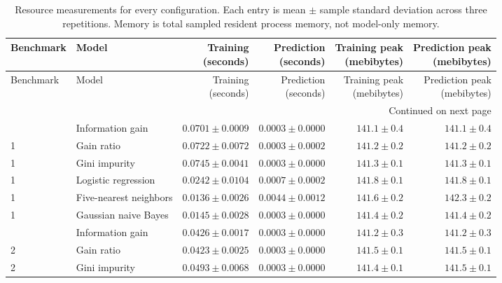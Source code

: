 \begin{longtable}{@{}l>{\raggedright\arraybackslash}p{1.05in}rrrr@{}}
\caption{Resource measurements for every configuration. Each entry is mean $\pm$ sample standard deviation across three repetitions. Memory is total sampled resident process memory, not model-only memory.}\label{tab:resources}\\
\toprule Benchmark & Model & \shortstack{Training\\(seconds)} & \shortstack{Prediction\\(seconds)} & \shortstack{Training peak\\(mebibytes)} & \shortstack{Prediction peak\\(mebibytes)} \\ \midrule
\endfirsthead
\toprule Benchmark & Model & \shortstack{Training\\(seconds)} & \shortstack{Prediction\\(seconds)} & \shortstack{Training peak\\(mebibytes)} & \shortstack{Prediction peak\\(mebibytes)} \\ \midrule
\endhead
\midrule \multicolumn{6}{r}{Continued on next page}\\ \endfoot
\bottomrule \endlastfoot
1 & Information gain & $0.0701 \pm 0.0009$ & $0.0003 \pm 0.0000$ & $141.1 \pm 0.4$ & $141.1 \pm 0.4$ \\
1 & Gain ratio & $0.0722 \pm 0.0072$ & $0.0003 \pm 0.0002$ & $141.2 \pm 0.2$ & $141.2 \pm 0.2$ \\
1 & Gini impurity & $0.0745 \pm 0.0041$ & $0.0003 \pm 0.0000$ & $141.3 \pm 0.1$ & $141.3 \pm 0.1$ \\
1 & Logistic regression & $0.0242 \pm 0.0104$ & $0.0007 \pm 0.0002$ & $141.8 \pm 0.1$ & $141.8 \pm 0.1$ \\
1 & Five-nearest neighbors & $0.0136 \pm 0.0026$ & $0.0044 \pm 0.0012$ & $141.6 \pm 0.2$ & $142.3 \pm 0.2$ \\
1 & Gaussian naive Bayes & $0.0145 \pm 0.0028$ & $0.0003 \pm 0.0000$ & $141.4 \pm 0.2$ & $141.4 \pm 0.2$ \\
\addlinespace
2 & Information gain & $0.0426 \pm 0.0017$ & $0.0003 \pm 0.0000$ & $141.2 \pm 0.3$ & $141.2 \pm 0.3$ \\
2 & Gain ratio & $0.0423 \pm 0.0025$ & $0.0003 \pm 0.0000$ & $141.5 \pm 0.1$ & $141.5 \pm 0.1$ \\
2 & Gini impurity & $0.0493 \pm 0.0068$ & $0.0003 \pm 0.0000$ & $141.4 \pm 0.1$ & $141.5 \pm 0.1$ \\

\end{longtable}

